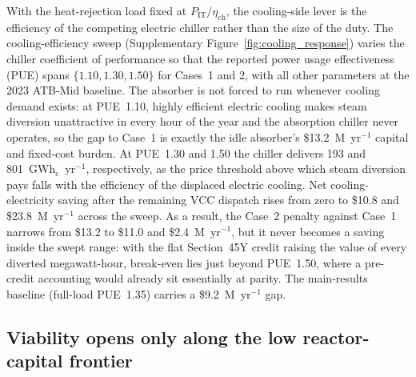 \documentclass[sn-vancouver,Numbered]{sn-jnl}%
\begin{document}
With the heat-rejection load fixed at $P_{\mathrm{IT}}/\eta_{\mathrm{ch}}$, the cooling-side lever is the efficiency of the competing electric chiller rather than the size of the duty. The cooling-efficiency sweep (Supplementary Figure~\ref{fig:cooling_response}) varies the chiller coefficient of performance so that the reported power usage effectiveness (PUE) spans $\{1.10, 1.30, 1.50\}$ for Cases~1 and 2, with all other parameters at the 2023 ATB-Mid baseline. The absorber is not forced to run whenever cooling demand exists: at PUE~1.10, highly efficient electric cooling makes steam diversion unattractive in every hour of the year and the absorption chiller never operates, so the gap to Case~1 is exactly the idle absorber's \$13.2~M~yr$^{-1}$ capital and fixed-cost burden. At PUE~1.30 and 1.50 the chiller delivers 193 and 801~GWh$_\mathrm{c}$~yr$^{-1}$, respectively, as the price threshold above which steam diversion pays falls with the efficiency of the displaced electric cooling. Net cooling-electricity saving after the remaining VCC dispatch rises from zero to \$10.8 and \$23.8~M~yr$^{-1}$ across the sweep. As a result, the Case~2 penalty against Case~1 narrows from \$13.2 to \$11.0 and \$2.4~M~yr$^{-1}$, but it never becomes a saving inside the swept range: with the flat Section~45Y credit raising the value of every diverted megawatt-hour, break-even lies just beyond PUE~1.50, where a pre-credit accounting would already sit essentially at parity. The main-results baseline (full-load PUE~1.35) carries a \$9.2~M~yr$^{-1}$ gap.

\subsection{Viability opens only along the low reactor-capital frontier}
\label{sec:results:frontier}
\end{document}
